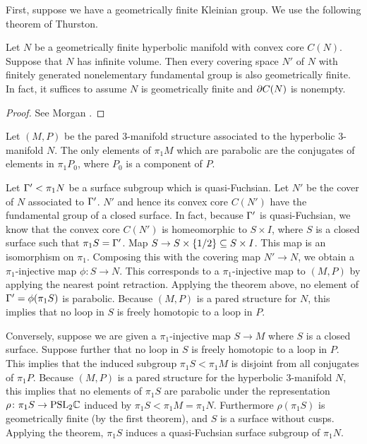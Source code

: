 First, suppose we have a geometrically finite Kleinian group.  We use the
following theorem of Thurston.

\begin{thm}

Let $N$ be a geometrically finite hyperbolic manifold with convex core $C(N)$.
Suppose that $N$ has infinite volume. Then every covering space $N'$ of $N$
with finitely generated nonelementary fundamental group is also geometrically
finite. In fact, it suffices to assume $N$ is geometrically finite and $\partial
C(N)$ is nonempty.


\end{thm}

\begin{proof}

See Morgan \cite[Proposition 7.1]{Mo}. %

\end{proof}


Let $(M,P)$ be the pared $3$-manifold structure associated to the hyperbolic
$3$-manifold $N$. The only elements of $\pi_1M$ which are parabolic are the
conjugates of elements in $\pi_1P_0$, where $P_0$ is a component of $P$.

Let $\Gamma' < \pi_1N$ be a surface subgroup which is quasi-Fuchsian. Let $N'$ be
the cover of $N$ associated to $\Gamma'$. $N'$ and hence its convex core $C(N')$
have the fundamental group of a closed surface. In fact, because $\Gamma'$ is
quasi-Fuchsian, we know that the convex core $C(N')$ is homeomorphic to $S
\times I$, where $S$ is a closed surface such that $\pi_1S = \Gamma'$.  Map $S \to
S \times \{1/2\} \subseteq S \times I$. This map is an isomorphism on $\pi_1$.
Composing this with the covering map $N' \to N$, we obtain a $\pi_1$-injective
map $\phi \colon S \to N$.  This corresponds to a $\pi_1$-injective map to
$(M,P)$ by applying the nearest point retraction.  Applying the theorem above,
no element of $\Gamma'=\phi(\pi_1S)$ is parabolic.  Because $(M,P)$ is a pared
structure for $N$, this implies that no loop in $S$ is freely homotopic to
a loop in $P$.

Conversely, suppose we are given a $\pi_1$-injective map $S \to M$ where $S$ is
a closed surface.  Suppose further that no loop in $S$ is freely homotopic to
a loop in $P$.  This implies that the induced subgroup $\pi_1S < \pi_1M$ is
disjoint from all conjugates of $\pi_1P$.  Because $(M,P)$ is a pared structure
for the hyperbolic $3$-manifold $N$, this implies that no elements of $\pi_1S$
are parabolic under the representation $\rho \colon \pi_1S \to \mathrm{PSL}_2\mathbb{C}$
induced by $\pi_1S < \pi_1M=\pi_1N$.  Furthermore $\rho(\pi_1S)$ is
geometrically finite (by the first theorem), and $S$ is a surface without
cusps.  Applying the theorem, $\pi_1S$ induces a quasi-Fuchsian surface
subgroup of $\pi_1N$.

